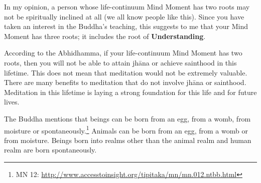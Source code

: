 \pagebreak


In my opinion, a person whose life-continuum Mind Moment has two roots may not be spiritually inclined at all (we all know people like this). Since you have taken an interest in the Buddha's teaching, this suggests to me that your Mind Moment has three roots; it includes the root of \textbf{Understanding}.

According to the Abhidhamma, if your life-continuum Mind Moment has two roots, then you will not be able to attain jhāna or achieve sainthood in this lifetime. This does not mean that meditation would not be extremely valuable. There are many benefits to meditation that do not involve jhāna or sainthood. Meditation in this lifetime is laying a strong foundation for this life and for future lives.


The Buddha mentions that beings can be born from an egg, from a womb, from moisture or spontaneously.\footnote{MN 12: \url{http://www.accesstoinsight.org/tipitaka/mn/mn.012.ntbb.html}} Animals can be born from an egg, from a womb or from moisture. Beings born into realms other than the animal realm and human realm are born spontaneously.

